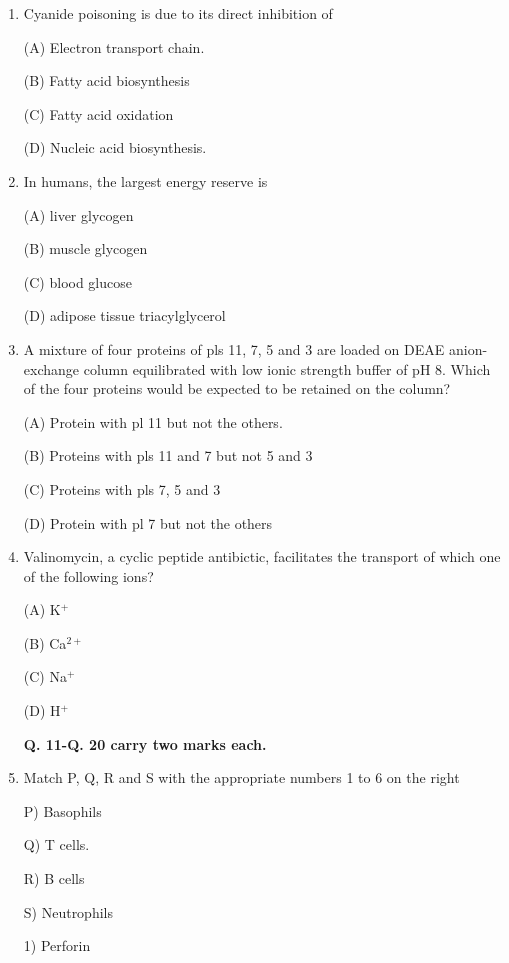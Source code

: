\documentclass[journal]{IEEEtran}
\begin{document}
\begin{enumerate}
{		(D) its weak electrolytic property}

	\item {Cyanide poisoning is due to its direct inhibition of

(A) Electron transport chain.

(B) Fatty acid biosynthesis

(C) Fatty acid oxidation

		(D) Nucleic acid biosynthesis.}

	\item{ In humans, the largest energy reserve is

(A) liver glycogen

(B) muscle glycogen

(C) blood glucose

(D) adipose tissue triacylglycerol}

\item {A mixture of four proteins of pls 11, 7, 5 and 3 are loaded on DEAE anion-exchange column equilibrated with low ionic strength buffer of pH 8. Which of the four proteins would be expected to be retained on the column?

(A) Protein with pl 11 but not the others.

(B) Proteins with pls 11 and 7 but not 5 and 3

(C) Proteins with pls 7, 5 and 3

(D) Protein with pl 7 but not the others}

\item {Valinomycin, a cyclic peptide antibictic, facilitates the transport of which one of the following ions?}

(A) K$^+$

(B) Ca$^{2+}$

(C) Na$^+$

(D) H$^+$
\begin{center}
\textbf{Q. 11-Q. 20 carry two marks each.}
\end{center}
\item {Match P, Q, R and S with the appropriate numbers 1 to 6 on the right}

	\begin{minipage}{0.5\textwidth}
	\begin{flushleft}

		P) Basophils

Q) T cells.

R) B cells

S) Neutrophils

		\end{flushleft}
		\end{minipage}
	\begin{minipage}{0.5\textwidth}
		\begin{flushleft}
1) Perforin


\end{flushleft}
\end{minipage}
\end{enumerate}
\end{document}
